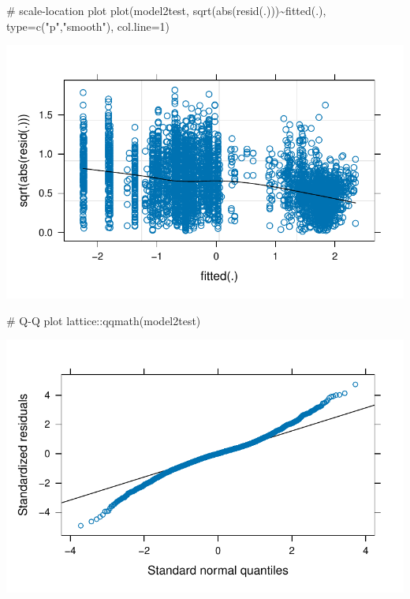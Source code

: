 \documentclass[
  letterpaper,
  DIV=11,
  numbers=noendperiod]{scrreprt}
\newenvironment{Shaded}{\begin{snugshade}}{\end{snugshade}}
\newcommand{\AttributeTok}[1]{\textcolor[rgb]{0.40,0.45,0.13}{#1}}
\newcommand{\CommentTok}[1]{\textcolor[rgb]{0.37,0.37,0.37}{#1}}
\newcommand{\DecValTok}[1]{\textcolor[rgb]{0.68,0.00,0.00}{#1}}
\newcommand{\FunctionTok}[1]{\textcolor[rgb]{0.28,0.35,0.67}{#1}}
\newcommand{\NormalTok}[1]{\textcolor[rgb]{0.00,0.23,0.31}{#1}}
\newcommand{\SpecialCharTok}[1]{\textcolor[rgb]{0.37,0.37,0.37}{#1}}
\newcommand{\StringTok}[1]{\textcolor[rgb]{0.13,0.47,0.30}{#1}}
\begin{document}
\begin{Shaded}
\begin{Highlighting}[]
\CommentTok{\# scale{-}location plot}
\FunctionTok{plot}\NormalTok{(model2test,}
     \FunctionTok{sqrt}\NormalTok{(}\FunctionTok{abs}\NormalTok{(}\FunctionTok{resid}\NormalTok{(.)))}\SpecialCharTok{\textasciitilde{}}\FunctionTok{fitted}\NormalTok{(.),}
     \AttributeTok{type=}\FunctionTok{c}\NormalTok{(}\StringTok{"p"}\NormalTok{,}\StringTok{"smooth"}\NormalTok{), }\AttributeTok{col.line=}\DecValTok{1}\NormalTok{)}
\end{Highlighting}
\end{Shaded}

\includegraphics{AppendixH_files/figure-pdf/lmer-diagnostics-2.pdf}

\begin{Shaded}
\begin{Highlighting}[]
\CommentTok{\# Q{-}Q plot}
\NormalTok{lattice}\SpecialCharTok{::}\FunctionTok{qqmath}\NormalTok{(model2test)}
\end{Highlighting}
\end{Shaded}

\includegraphics{AppendixH_files/figure-pdf/lmer-diagnostics-3.pdf}
\end{document}
